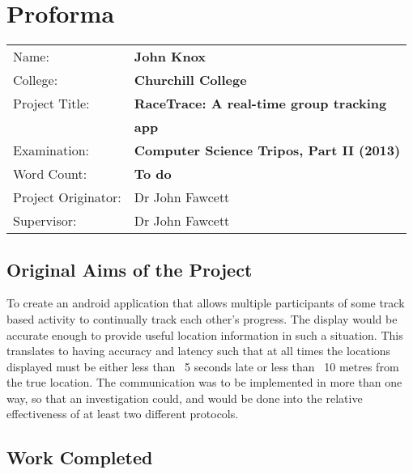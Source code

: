 \setcounter{page}{1}
\pagestyle{plain}

\chapter*{Proforma}

{\large
\begin{tabular}{ll}
Name:               & \bf John Knox                                 \\
College:            & \bf Churchill College                         \\
Project Title:      & \bf RaceTrace: A real-time group tracking                   \\
                    & \bf app                        \\
Examination:        & \bf Computer Science Tripos, Part II (2013)   \\
Word Count:         & \bf To do\footnotemark[1]                     \\
Project Originator: & Dr John Fawcett                               \\
Supervisor:         & Dr John Fawcett                               \\ 
\end{tabular}
}


\section*{Original Aims of the Project}

To create an android application that allows multiple participants of some track based activity to continually track each other's progress. The display would be accurate enough to provide useful location information in such a situation. This translates to having accuracy and latency such that at all times the locations displayed must be either less than ~5 seconds late or less than ~10 metres from the true location.
The communication was to be implemented in more than one way, so that an investigation could, and would be done into the relative effectiveness of at least two different protocols.


\section*{Work Completed}


